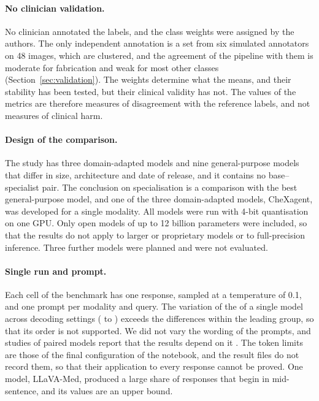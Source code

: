 \paragraph{No clinician validation.} No clinician annotated the labels, and the class weights were assigned by the authors. The only independent annotation is a set from six simulated annotators on 48 images, which are clustered, and the agreement of the pipeline with them is moderate for fabrication and weak for most other classes (Section~\ref{sec:validation}). The weights determine what the \SMHR{} means, and their stability has been tested, but their clinical validity has not. The values of the metrics are therefore measures of disagreement with the reference labels, and not measures of clinical harm.

\paragraph{Design of the comparison.} The study has three domain-adapted models and nine general-purpose models that differ in size, architecture and date of release, and it contains no base--specialist pair. The conclusion on specialisation is a comparison with the best general-purpose model, and one of the three domain-adapted models, CheXagent, was developed for a single modality. All models were run with 4-bit quantisation on one GPU. Only open models of up to 12 billion parameters were included, so that the results do not apply to larger or proprietary models or to full-precision inference. Three further models were planned and were not evaluated.

\paragraph{Single run and prompt.} Each cell of the benchmark has one response, sampled at a temperature of 0.1, and one prompt per modality and query. The variation of the \SMHR{} of a single model across decoding settings ( to ) exceeds the differences within the leading group, so that its order is not supported. We did not vary the wording of the prompts, and studies of paired models report that the results depend on it \citep{mclaughlin2026knowledge}. The token limits are those of the final configuration of the notebook, and the result files do not record them, so that their application to every response cannot be proved. One model, LLaVA-Med, produced a large share of responses that begin in mid-sentence, and its values are an upper bound.

